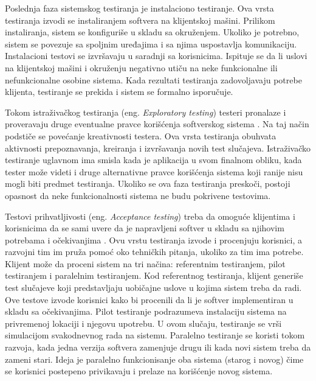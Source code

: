 \documentclass[12pt,oneside]{memoir}
\begin{document}
\par
Poslednja faza sistemskog testiranja je instalaciono testiranje.
Ova vrsta testiranja izvodi se instaliranjem softvera na klijentskoj mašini.
Prilikom instaliranja, sistem se konfiguriše u skladu sa okruženjem.
Ukoliko je potrebno, sistem se povezuje sa spoljnim uređajima i sa njima uspostavlja komunikaciju. 
Instalacioni testovi se izvršavaju u saradnji sa korisnicima. Ispituje se da li uslovi na klijentskoj mašini i okruženju negativno utiču na neke funkcionalne ili nefunkcionalne osobine sistema. 
Kada rezultati testiranja zadovoljavaju potrebe klijenta, testiranje se prekida i sistem se formalno isporučuje.
\par


Tokom istraživačkog testiranja (eng. \textit{Exploratory testing}) testeri pronalaze i proveravaju druge eventualne pravce korišćenja softverskog sistema \cite{ExploratoryTesting}. Na taj način podstiče se povećanje kreativnosti testera. Ova vrsta testiranja obuhvata aktivnosti prepoznavanja, kreiranja i izvršavanja novih test slučajeva. Istraživačko testiranje uglavnom ima smisla kada je aplikacija u svom finalnom obliku, kada tester može videti i druge alternativne pravce korišćenja sistema koji ranije nisu mogli biti predmet testiranja. Ukoliko se ova faza testiranja preskoči, postoji opasnost da neke funkcionalnosti sistema ne budu pokrivene testovima.
\par 


Testovi prihvatljivosti (eng. \textit{Acceptance testing}) 
treba da omoguće klijentima i korisnicima da se sami uvere da je napravljeni softver u skladu sa njihovim potrebama i očekivanjima \cite{AcceptanceTesting}.
Ovu vrstu testiranja izvode i procenjuju korisnici, a razvojni tim im pruža pomoć oko tehničkih pitanja, ukoliko za tim ima potrebe.
Klijent može da proceni sistem na tri načina: referentnim testiranjem, pilot testiranjem i paralelnim testiranjem. Kod referentnog testiranja, klijent generiše test slučajeve koji predstavljaju uobičajne uslove u kojima sistem treba da radi. Ove testove izvode korisnici kako bi procenili da li je softver implementiran u skladu sa očekivanjima. Pilot testiranje podrazumeva instalaciju sistema na privremenoj lokaciji i njegovu upotrebu. U ovom slučaju, testiranje se vrši simulacijom svakodnevnog rada na sistemu.
Paralelno testiranje se koristi tokom razvoja, kada jedna verzija softvera zamenjuje drugu ili kada novi sistem treba da zameni stari. 
Ideja je paralelno funkcionisanje oba sistema (starog i novog) čime se korisnici postepeno privikavaju i prelaze na korišćenje novog sistema.
\par 
\end{document}
